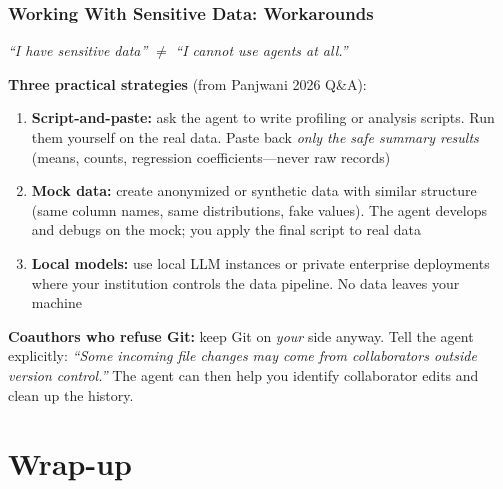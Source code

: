 \documentclass[10pt,english,aspectratio=169]{beamer}
\begin{document}
\begin{frame}
\frametitle{Working With Sensitive Data: Workarounds}

\textit{``I have sensitive data''} $\neq$ \textit{``I cannot use agents at all.''}

\vspace{0.3cm}

\textbf{Three practical strategies} (from Panjwani 2026 Q\&A):

\begin{enumerate}
    \item \textbf{Script-and-paste:} ask the agent to write profiling or analysis scripts. Run them yourself on the real data. Paste back \textit{only the safe summary results} (means, counts, regression coefficients---never raw records)
    \vspace{0.1cm}
    \item \textbf{Mock data:} create anonymized or synthetic data with similar structure (same column names, same distributions, fake values). The agent develops and debugs on the mock; you apply the final script to real data
    \vspace{0.1cm}
    \item \textbf{Local models:} use local LLM instances or private enterprise deployments where your institution controls the data pipeline. No data leaves your machine
\end{enumerate}

\vspace{0.3cm}

\textbf{Coauthors who refuse Git:} keep Git on \textit{your} side anyway. Tell the agent explicitly: \textit{``Some incoming file changes may come from collaborators outside version control.''} The agent can then help you identify collaborator edits and clean up the history.
\end{frame}

\section{Wrap-up}
\end{document}
